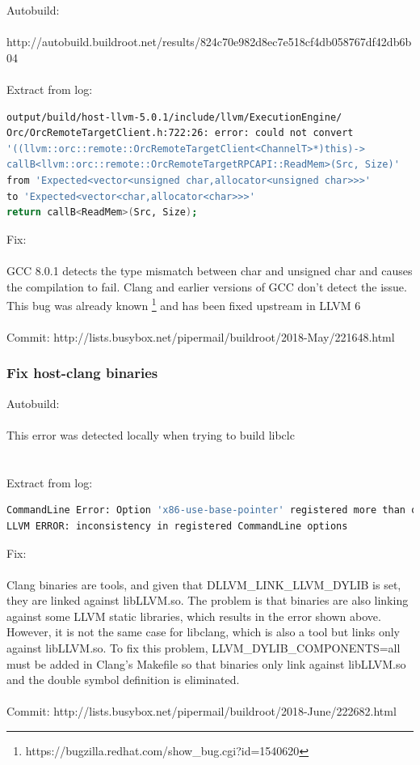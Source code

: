 \documentclass[12pt,a4paper,oneside]{article}
\begin{document}
Autobuild:\\\\
http://autobuild.buildroot.net/results/824c70e982d8ec7e518cf4db058767df42db6b04\\\\
Extract from log:
\begin{lstlisting}[language=sh,keywords={}]
output/build/host-llvm-5.0.1/include/llvm/ExecutionEngine/
Orc/OrcRemoteTargetClient.h:722:26: error: could not convert
'((llvm::orc::remote::OrcRemoteTargetClient<ChannelT>*)this)->
callB<llvm::orc::remote::OrcRemoteTargetRPCAPI::ReadMem>(Src, Size)'
from 'Expected<vector<unsigned char,allocator<unsigned char>>>'
to 'Expected<vector<char,allocator<char>>>'
return callB<ReadMem>(Src, Size);
\end{lstlisting}
Fix:\\\\
GCC 8.0.1 detects the type mismatch between char and unsigned char and causes the
compilation to fail. Clang and earlier versions of GCC don't detect the issue.
This bug was already known
\footnote{https://bugzilla.redhat.com/show\_bug.cgi?id=1540620} and has been
fixed upstream in LLVM 6\\\\
Commit: http://lists.busybox.net/pipermail/buildroot/2018-May/221648.html
\subsubsection*{Fix host-clang binaries}
Autobuild:\\\\
This error was detected locally when trying to build libclc\\\\\\
Extract from log:
\begin{lstlisting}[language=sh,keywords={}]
CommandLine Error: Option 'x86-use-base-pointer' registered more than once!
LLVM ERROR: inconsistency in registered CommandLine options
\end{lstlisting}
Fix:\\\\
Clang binaries are tools, and given that DLLVM\_LINK\_LLVM\_DYLIB is set,
they are linked against libLLVM.so. The problem is that binaries are
also linking against some LLVM static libraries, which results in the error
shown above. However, it is not the same case for libclang, which is also
a tool but links only against libLLVM.so. To fix this problem,
LLVM\_DYLIB\_COMPONENTS=all must be added in Clang's Makefile so that binaries
only link against libLLVM.so and the double symbol definition is eliminated.
\\\\
Commit: http://lists.busybox.net/pipermail/buildroot/2018-June/222682.html
\end{document}
